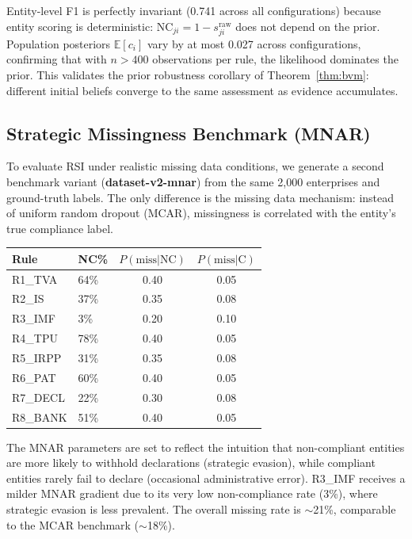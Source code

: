 Entity-level F1 is perfectly invariant (0.741 across all
configurations) because entity scoring is deterministic:
$\mathrm{NC}_{ji} = 1 - s_{ji}^{\mathrm{raw}}$ does not depend on
the prior. Population posteriors $\mathbb{E}[c_i]$ vary by at most
0.027 across configurations, confirming that with $n > 400$
observations per rule, the likelihood dominates the prior. This
validates the prior robustness corollary of Theorem~\ref{thm:bvm}:
different initial beliefs converge to the same assessment as evidence
accumulates.


\subsection{Strategic Missingness Benchmark (MNAR)}

To evaluate RSI under realistic missing data conditions, we generate
a second benchmark variant (\textbf{dataset-v2-mnar}) from the same
2{,}000 enterprises and ground-truth labels. The only difference is
the missing data mechanism: instead of uniform random dropout (MCAR),
missingness is correlated with the entity's true compliance label.

\begin{center}
\renewcommand{\arraystretch}{1.15}
\begin{tabular}{llcc}
\toprule
\textbf{Rule} & \textbf{NC\%} & $P(\text{miss}|\text{NC})$ & $P(\text{miss}|\text{C})$ \\
\midrule
R1\_TVA  & 64\% & 0.40 & 0.05 \\
R2\_IS   & 37\% & 0.35 & 0.08 \\
R3\_IMF  &  3\% & 0.20 & 0.10 \\
R4\_TPU  & 78\% & 0.40 & 0.05 \\
R5\_IRPP & 31\% & 0.35 & 0.08 \\
R6\_PAT  & 60\% & 0.40 & 0.05 \\
R7\_DECL & 22\% & 0.30 & 0.08 \\
R8\_BANK & 51\% & 0.40 & 0.05 \\
\bottomrule
\end{tabular}
\end{center}

The MNAR parameters are set to reflect the intuition that non-compliant
entities are more likely to withhold declarations (strategic evasion),
while compliant entities rarely fail to declare (occasional
administrative error). R3\_IMF receives a milder MNAR gradient due to
its very low non-compliance rate (3\%), where strategic evasion is less
prevalent. The overall missing rate is $\sim$21\%, comparable to the
MCAR benchmark ($\sim$18\%).

